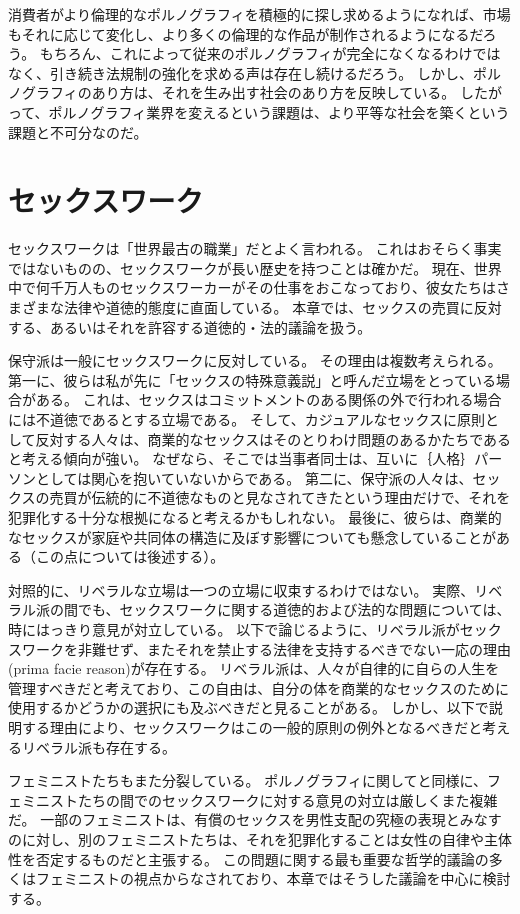 \documentclass[paper=a4,book,openany]{jlreq}
\begin{document}
消費者がより倫理的なポルノグラフィを積極的に探し求めるようになれば、市場もそれに応じて変化し、より多くの倫理的な作品が制作されるようになるだろう。
もちろん、これによって従来のポルノグラフィが完全になくなるわけではなく、引き続き法規制の強化を求める声は存在し続けるだろう。
しかし、ポルノグラフィのあり方は、それを生み出す社会のあり方を反映している。
したがって、ポルノグラフィ業界を変えるという課題は、より平等な社会を築くという課題と不可分なのだ。

\section{セックスワーク}

セックスワークは「世界最古の職業」だとよく言われる。
これはおそらく事実ではないものの、セックスワークが長い歴史を持つことは確かだ。
現在、世界中で何千万人ものセックスワーカーがその仕事をおこなっており、彼女たちはさまざまな法律や道徳的態度に直面している。
本章では、セックスの売買に反対する、あるいはそれを許容する道徳的・法的議論を扱う。

保守派は一般にセックスワークに反対している。
その理由は複数考えられる。
第一に、彼らは私が先に「セックスの特殊意義説」と呼んだ立場をとっている場合がある。
これは、セックスはコミットメントのある関係の外で行われる場合には不道徳であるとする立場である。
そして、カジュアルなセックスに原則として反対する人々は、商業的なセックスはそのとりわけ問題のあるかたちであると考える傾向が強い。
なぜなら、そこでは当事者同士は、互いに｛人格｝{パーソン}としては関心を抱いていないからである。
第二に、保守派の人々は、セックスの売買が伝統的に不道徳なものと見なされてきたという理由だけで、それを犯罪化する十分な根拠になると考えるかもしれない。
最後に、彼らは、商業的なセックスが家庭や共同体の構造に及ぼす影響についても懸念していることがある（この点については後述する）。

対照的に、リベラルな立場は一つの立場に収束するわけではない。
実際、リベラル派の間でも、セックスワークに関する道徳的および法的な問題については、時にはっきり意見が対立している。
以下で論じるように、リベラル派がセックスワークを非難せず、またそれを禁止する法律を支持するべきでない一応の理由(prima facie reason)が存在する。
リベラル派は、人々が自律的に自らの人生を管理すべきだと考えており、この自由は、自分の体を商業的なセックスのために使用するかどうかの選択にも及ぶべきだと見ることがある。
しかし、以下で説明する理由により、セックスワークはこの一般的原則の例外となるべきだと考えるリベラル派も存在する。

フェミニストたちもまた分裂している。
ポルノグラフィに関してと同様に、フェミニストたちの間でのセックスワークに対する意見の対立は厳しくまた複雑だ。
一部のフェミニストは、有償のセックスを男性支配の究極の表現とみなすのに対し、別のフェミニストたちは、それを犯罪化することは女性の自律や主体性を否定するものだと主張する。
この問題に関する最も重要な哲学的議論の多くはフェミニストの視点からなされており、本章ではそうした議論を中心に検討する。
\end{document}
